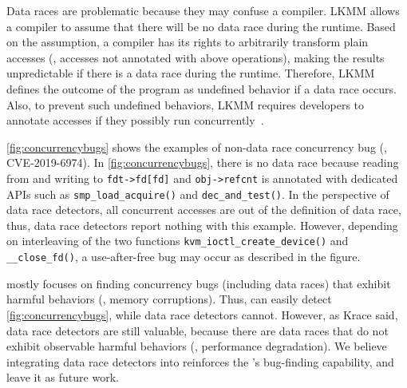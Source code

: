 Data races are problematic because they may confuse a compiler.  LKMM
allows a compiler to assume that there will be no data race during the
runtime. Based on the assumption, a compiler has its rights to
arbitrarily transform plain accesses (\ie, accesses not annotated with
above operations), making the results unpredictable if there is a data
race during the runtime.
%
Therefore, LKMM defines the outcome of the program as undefined
behavior if a data race occurs.
%
Also, to prevent such undefined behaviors, LKMM requires developers to
annotate accesses if they possibly run
concurrently~\cite{data-race-fix1, data-race-fix2, data-race-fix3}.





%
%
\autoref{fig:concurrencybugs} shows the examples of non-data race
concurrency bug (\ie, CVE-2019-6974).
%
In \autoref{fig:concurrencybugs}, there is no data race because
reading from and writing to \texttt{fdt->fd[fd]} and
\texttt{obj->refcnt} is annotated with dedicated APIs such as
\texttt{smp_load_acquire()} and \texttt{dec_and_test()}.
%
In the perspective of data race detectors, all concurrent accesses are
out of the definition of data race, thus, data race detectors report
nothing with this example.
%
However, depending on interleaving of the two functions
\texttt{kvm_ioctl_create_device()} and \texttt{__close_fd()}, a
use-after-free bug may occur as described in the figure.



%
\sys mostly focuses on finding concurrency bugs (including data races)
that exhibit harmful behaviors (\eg, memory corruptions). Thus, \sys
can easily detect \autoref{fig:concurrencybugs}, while data race
detectors cannot.
%
However, as Krace said, data race detectors are still valuable,
because there are data races that do not exhibit observable harmful
behaviors (\ie, performance degradation).
%
We believe integrating data race detectors into \sys reinforces the
\sys's bug-finding capability, and leave it as future work.



